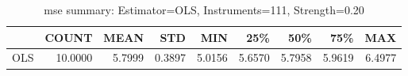 \begin{table}[ht]
\centering
\caption{mse summary: Estimator=OLS, Instruments=111, Strength=0.20}
\begin{tabular}{lrrrrrrrr}
\toprule
 & COUNT & MEAN & STD & MIN & 25\% & 50\% & 75\% & MAX \\
\midrule
OLS & 10.0000 & 5.7999 & 0.3897 & 5.0156 & 5.6570 & 5.7958 & 5.9619 & 6.4977 \\
\bottomrule
\end{tabular}
\end{table}
